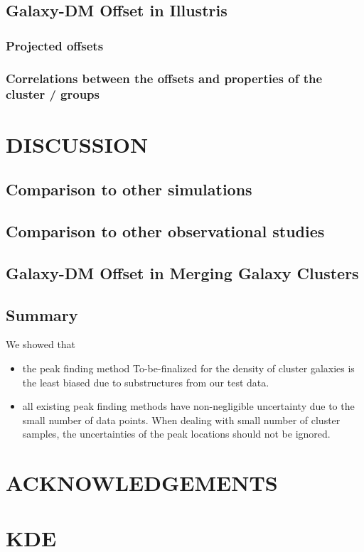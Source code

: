 \documentclass[letterpaper,useAMS,usenatbib]{mn2e}
\begin{document}
\subsection{Galaxy-DM Offset in Illustris}
\subsubsection{Projected offsets}
\subsubsection{Correlations between the offsets and properties of the cluster / groups}
\section{DISCUSSION}
\subsection{Comparison to other simulations}
\subsection{Comparison to other observational studies}
\subsection{Galaxy-DM Offset in Merging Galaxy Clusters}
\subsection{Summary}
We showed that 
\begin{itemize}
		\item  the peak finding method To-be-finalized for the density of cluster
			galaxies is the least biased due to substructures from our test data. 
		\item  all existing peak finding methods have non-negligible uncertainty 
			due to the small number of data points. When dealing with small number of
			cluster samples, the uncertainties of the peak locations should not be
			ignored.
\end{itemize}

\section{ACKNOWLEDGEMENTS}




\appendix
\section{KDE}
\clearpage\bsp\label{lastpage} 
\end{document}
